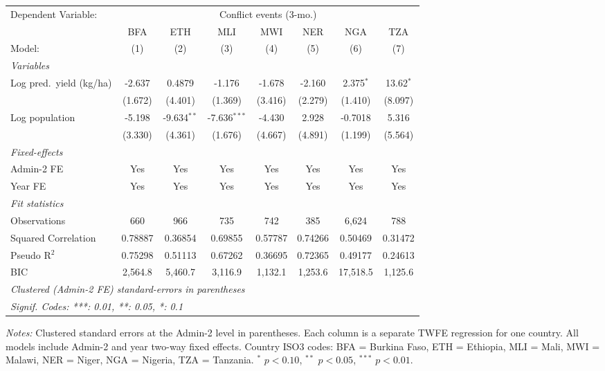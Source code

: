 
\begingroup
\centering
\begin{tabular}{lccccccc}
   \tabularnewline \midrule \midrule
   Dependent Variable: & \multicolumn{7}{c}{Conflict events (3-mo.)}\\
                             & BFA     & ETH           & MLI            & MWI     & NER     & NGA         & TZA \\   
   Model:                    & (1)     & (2)           & (3)            & (4)     & (5)     & (6)         & (7)\\  
   \midrule
   \emph{Variables}\\
   Log pred.\ yield (kg/ha)  & -2.637  & 0.4879        & -1.176         & -1.678  & -2.160  & 2.375$^{*}$ & 13.62$^{*}$\\   
                             & (1.672) & (4.401)       & (1.369)        & (3.416) & (2.279) & (1.410)     & (8.097)\\   
   Log population            & -5.198  & -9.634$^{**}$ & -7.636$^{***}$ & -4.430  & 2.928   & -0.7018     & 5.316\\   
                             & (3.330) & (4.361)       & (1.676)        & (4.667) & (4.891) & (1.199)     & (5.564)\\   
   \midrule
   \emph{Fixed-effects}\\
   Admin-2 FE                & Yes     & Yes           & Yes            & Yes     & Yes     & Yes         & Yes\\  
   Year FE                   & Yes     & Yes           & Yes            & Yes     & Yes     & Yes         & Yes\\  
   \midrule
   \emph{Fit statistics}\\
   Observations              & 660     & 966           & 735            & 742     & 385     & 6,624       & 788\\  
   Squared Correlation       & 0.78887 & 0.36854       & 0.69855        & 0.57787 & 0.74266 & 0.50469     & 0.31472\\  
   Pseudo R$^2$              & 0.75298 & 0.51113       & 0.67262        & 0.36695 & 0.72365 & 0.49177     & 0.24613\\  
   BIC                       & 2,564.8 & 5,460.7       & 3,116.9        & 1,132.1 & 1,253.6 & 17,518.5    & 1,125.6\\  
   \midrule \midrule
   \multicolumn{8}{l}{\emph{Clustered (Admin-2 FE) standard-errors in parentheses}}\\
   \multicolumn{8}{l}{\emph{Signif. Codes: ***: 0.01, **: 0.05, *: 0.1}}\\
\end{tabular}
 
\par \raggedright 
\textit{Notes:} Clustered standard errors at the Admin-2 level in parentheses. Each column is a separate TWFE regression for one country. All models include Admin-2 and year two-way fixed effects. Country ISO3 codes: BFA = Burkina Faso, ETH = Ethiopia, MLI = Mali, MWI = Malawi, NER = Niger, NGA = Nigeria, TZA = Tanzania. $^{*}$ $p<0.10$, $^{**}$ $p<0.05$, $^{***}$ $p<0.01$.
\par\endgroup


